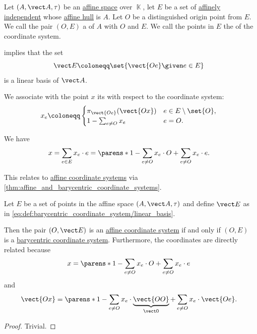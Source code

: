 \begin{definition}\label{def:barycentric_coordinate_system}
  Let \( (A, \vect A, \tau) \) be an \hyperref[def:affine_space]{affine space} over \( \BbbK \), let \( E \) be a set of \hyperref[def:affine_dependence]{affinely independent} whose \hyperref[def:affine_hull]{affine hull} is \( A \). Let \( O \) be a distinguished origin point from \( E \). We call the pair \( (O, E) \) a  of \( A \) with  \( O \) and  \( E \). We call the points in \( E \) the  of the coordinate system.

   implies that the set
  \begin{equation}\label{eq:def:barycentric_coordinate_system/linear_basis}
    \vect E \coloneqq \set{ \vect{Oe} \given e \in E }
  \end{equation}
  is a linear basis of \( \vect A \).

  We associate with the point \( x \) its  with respect to the coordinate system:
  \begin{equation*}
    x_e \coloneqq \begin{cases}
      \pi_{\vect{Oe}}(\vect{Ox}) &e \in E \setminus \set{ O }, \\
      1 - \sum_{e \neq O} x_e    &e = O.
    \end{cases}
  \end{equation*}

  We have
  \begin{equation}\label{eq:def:barycentric_coordinate_system/coordinates}
    x = \sum_{e \in E} x_e \cdot e = \parens*{ 1 - \sum_{e \neq O} x_e } \cdot O + \sum_{e \neq O} x_e \cdot e.
  \end{equation}

  This relates to \hyperref[def:affine_coordinate_system]{affine coordinate systems} via \cref{thm:affine_and_barycentric_coordinate_systems}.
\end{definition}

\begin{proposition}\label{thm:affine_and_barycentric_coordinate_systems}
  Let \( E \) be a set of points in the affine space \( (A, \vect A, \tau) \) and define \( \vect E \) as in \eqref{eq:def:barycentric_coordinate_system/linear_basis}.

  Then the pair \( (O, \vect E) \) is an \hyperref[def:affine_coordinate_system]{affine coordinate system} if and only if \( (O, E) \) is a \hyperref[def:barycentric_coordinate_system]{barycentric coordinate system}. Furthermore, the coordinates are directly related because
  \begin{equation*}
    x = \parens*{ 1 - \sum_{e \neq O} x_e } \cdot O + \sum_{e \neq O} x_e \cdot e
  \end{equation*}
  and
  \begin{equation*}
    \vect{Ox} = \parens*{ 1 - \sum_{e \neq O} x_e } \cdot \underbrace{\vect{OO}}_{\vect 0} + \sum_{e \neq O} x_e \cdot \vect{Oe}.
  \end{equation*}
\end{proposition}
\begin{proof}
  Trivial.
\end{proof}

